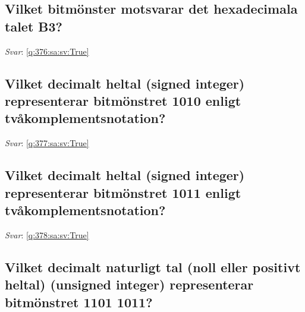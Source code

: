 \documentclass[a4paper,11pt,oneside]{article}
\begin{document}
\begin{sloppypar}
\subsection{Vilket bitm\"onster motsvarar det hexadecimala talet B3?}

\label{q:376:sa:sv:False}

\vspace{2cm}

\noindent\makebox[\textwidth]{\hrulefill}

\vspace{1cm}

\textit{Svar}: \autoref{q:376:sa:sv:True}



\subsection{Vilket decimalt heltal (signed integer) representerar bitm\"onstret 1010 enligt tv\r{a}komplementsnotation?}

\label{q:377:sa:sv:False}

\vspace{2cm}

\noindent\makebox[\textwidth]{\hrulefill}

\vspace{1cm}

\textit{Svar}: \autoref{q:377:sa:sv:True}



\subsection{Vilket decimalt heltal (signed integer) representerar bitm\"onstret 1011 enligt tv\r{a}komplementsnotation?}

\label{q:378:sa:sv:False}

\vspace{2cm}

\noindent\makebox[\textwidth]{\hrulefill}

\vspace{1cm}

\textit{Svar}: \autoref{q:378:sa:sv:True}



\subsection{Vilket decimalt naturligt tal (noll eller positivt heltal) (unsigned integer) representerar bitm\"onstret 1101 1011?}


\end{sloppypar}
\end{document}
